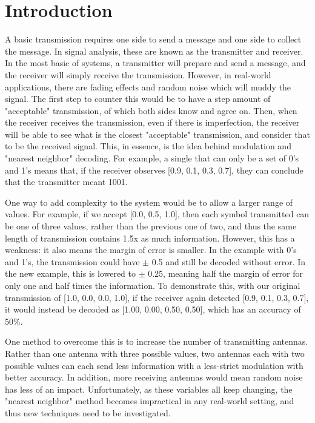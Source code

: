 \documentclass[conference]{IEEEtran}
\begin{document}
\IEEEpeerreviewmaketitle

\section{Introduction}
A basic transmission requires one side to send a message and one side to collect the message. In signal analysis, these are known as the transmitter and receiver. In the most basic of systems, a transmitter will prepare and send a message, and the receiver will simply receive the transmission. However, in real-world applications, there are fading effects and random noise which will muddy the signal. The first step to counter this would be to have a step amount of "acceptable" transmission, of which both sides know and agree on. Then, when the receiver receives the transmission, even if there is imperfection, the receiver will be able to see what is the closest "acceptable" transmission, and consider that to be the received signal. This, in essence, is the idea behind modulation and "nearest neighbor" decoding. For example, a single that can only be a set of 0's and 1's means that, if the receiver observes [0.9, 0.1, 0.3, 0.7], they can conclude that the transmitter meant 1001. \par
One way to add complexity to the system would be to allow a larger range of values. For example, if we accept [0.0, 0.5, 1.0], then each symbol transmitted can be one of three values, rather than the previous one of two, and thus the same length of transmission contains 1.5x as much information. However, this has a weakness: it also means the margin of error is smaller. In the example with 0's and 1's, the transmission could have $\pm$ 0.5 and still be decoded without error. In the new example, this is lowered to $\pm$ 0.25, meaning half the margin of error for only one and half times the information. To demonstrate this, with our original transmission of [1.0, 0.0, 0.0, 1.0], if the receiver again detected [0.9, 0.1, 0.3, 0.7], it would instead be decoded as [1.00, 0.00, 0.50, 0.50], which has an accuracy of 50\%.\par
One method to overcome this is to increase the number of transmitting antennas. Rather than one antenna with three possible values, two antennas each with two possible values can each send less information with a less-strict modulation with better accuracy. In addition, more receiving antennas would mean random noise has less of an impact. Unfortunately, as these variables all keep changing, the "nearest neighbor" method becomes impractical in any real-world setting, and thus new techniques need to be investigated.\par
\end{document}
